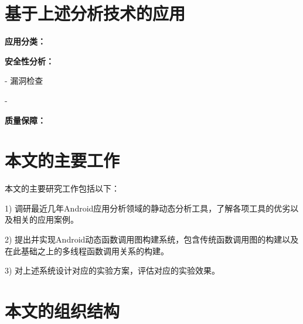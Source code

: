 \section{基于上述分析技术的应用}

\textbf{应用分类：}

\textbf{安全性分析：}

- 漏洞检查

- 

\textbf{质量保障：}


\section{本文的主要工作}

本文的主要研究工作包括以下：

1)	调研最近几年Android应用分析领域的静动态分析工具，了解各项工具的优劣以及相关的应用案例。

2)	提出并实现Android动态函数调用图构建系统，包含传统函数调用图的构建以及在此基础之上的多线程函数调用关系的构建。

3)	对上述系统设计对应的实验方案，评估对应的实验效果。

\section{本文的组织结构}

